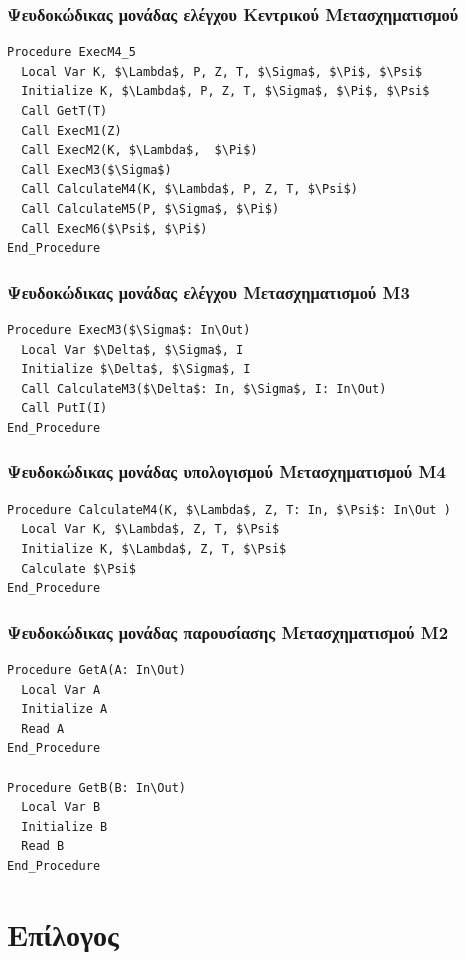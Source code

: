 \documentclass{article}
\begin{document}
\subsubsection{Ψευδοκώδικας μονάδας ελέγχου Κεντρικού Μετασχηματισμού}
\begin{lstlisting}[mathescape]
Procedure ExecM4_5
  Local Var K, $\Lambda$, P, Z, T, $\Sigma$, $\Pi$, $\Psi$
  Initialize K, $\Lambda$, P, Z, T, $\Sigma$, $\Pi$, $\Psi$
  Call GetT(T)
  Call ExecM1(Z)
  Call ExecM2(K, $\Lambda$,  $\Pi$)
  Call ExecM3($\Sigma$)
  Call CalculateM4(K, $\Lambda$, P, Z, T, $\Psi$)
  Call CalculateM5(P, $\Sigma$, $\Pi$)
  Call ExecM6($\Psi$, $\Pi$)
End_Procedure
\end{lstlisting}

\subsubsection{Ψευδοκώδικας μονάδας ελέγχου Μετασχηματισμού Μ3}
\begin{lstlisting}[mathescape]
Procedure ExecM3($\Sigma$: In\Out)
  Local Var $\Delta$, $\Sigma$, I
  Initialize $\Delta$, $\Sigma$, I
  Call CalculateM3($\Delta$: In, $\Sigma$, I: In\Out)
  Call PutI(I)
End_Procedure
\end{lstlisting}

\subsubsection{Ψευδοκώδικας μονάδας υπολογισμού Μετασχηματισμού Μ4}
\begin{lstlisting}[mathescape]
Procedure CalculateM4(K, $\Lambda$, Z, T: In, $\Psi$: In\Out )
  Local Var K, $\Lambda$, Z, T, $\Psi$
  Initialize K, $\Lambda$, Z, T, $\Psi$
  Calculate $\Psi$
End_Procedure
\end{lstlisting}

\subsubsection{Ψευδοκώδικας μονάδας παρουσίασης Μετασχηματισμού Μ2}
\begin{lstlisting}[mathescape]
Procedure GetA(A: In\Out)
  Local Var A
  Initialize A
  Read A
End_Procedure

Procedure GetB(B: In\Out)
  Local Var B
  Initialize B
  Read B
End_Procedure
\end{lstlisting}

\newpage
\section{Επίλογος}
\end{document}
